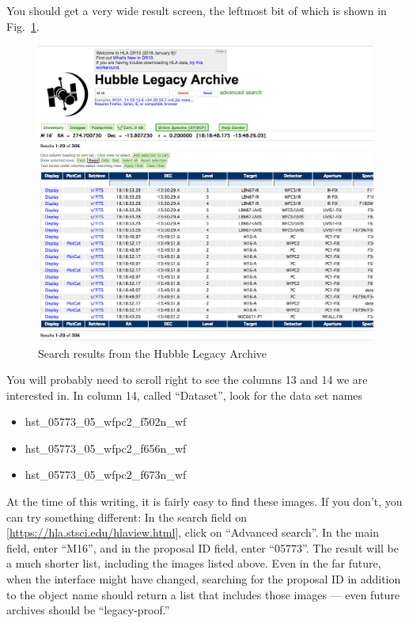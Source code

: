 \documentclass[twocolumn,apj]{openjournal}
\begin{document}
You should get a very wide result screen, the leftmost bit of which is shown in Fig.~\ref{HLSIntro}.
\begin{figure}[htbp]
\begin{center}
\includegraphics[width=\linewidth]{hubble-legacy-start-left.jpg}
\caption{Search results from the Hubble Legacy Archive}
\label{HLSIntro}
\end{center}
\end{figure}
You will probably need to scroll right to see the columns 13 and 14 we are interested in. In column 14, called ``Dataset'', look for the data set names
\begin{itemize}
\item hst\_05773\_05\_wfpc2\_f502n\_wf
\item hst\_05773\_05\_wfpc2\_f656n\_wf
\item hst\_05773\_05\_wfpc2\_f673n\_wf
\end{itemize}
At the time of this writing, it is fairly easy to find these images. If you don't, you can try something different: In the search field on [\href{https://hla.stsci.edu/hlaview.html}{https://hla.stsci.edu/hlaview.html}], click on ``Advanced search''. In the main field, enter ``M16'', and in the proposal ID field, enter ``05773''. The result will be a much shorter list, including the images listed above. Even in the far future, when the interface might have changed, searching for the proposal ID in addition to the object name should return a list that includes those images --- even future archives should be ``legacy-proof.''
\end{document}
